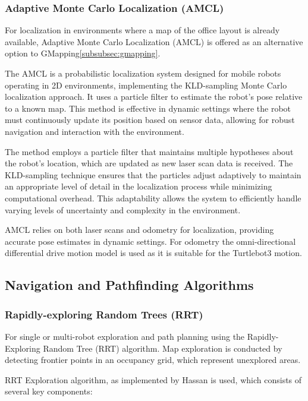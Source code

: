 \documentclass[a4paper,twocolumn]{article}
\begin{document}
\subsubsection{Adaptive Monte Carlo Localization (AMCL)}
For localization in environments where a map of the office layout is already available, Adaptive Monte Carlo Localization (AMCL) is offered as an alternative option to GMapping\ref{subsubsec:gmapping}. 

The AMCL is a probabilistic localization system designed for mobile robots operating in 2D environments, implementing the KLD-sampling Monte Carlo localization approach\cite{thrun2005probabilistic}. It uses a particle filter to estimate the robot's pose relative to a known map. This method is effective in dynamic settings where the robot must continuously update its position based on sensor data, allowing for robust navigation and interaction with the environment.

The method employs a particle filter that maintains multiple hypotheses about the robot's location, which are updated as new laser scan data is received. The KLD-sampling technique ensures that the particles adjust adaptively to maintain an appropriate level of detail in the localization process while minimizing computational overhead. This adaptability allows the system to efficiently handle varying levels of uncertainty and complexity in the environment.

AMCL relies on both laser scans and odometry for localization, providing accurate pose estimates in dynamic settings. For odometry the omni-directional differential drive motion model is used as it is suitable for the Turtlebot3 motion.


\subsection{Navigation and Pathfinding Algorithms}

\subsubsection{Rapidly-exploring Random Trees (RRT)}
\label{subsubsec:rrt}
For single or multi-robot exploration and path planning using the Rapidly-Exploring Random Tree (RRT) algorithm. Map exploration is conducted by detecting frontier points in an occupancy grid, which represent unexplored areas.

RRT Exploration algorithm, as implemented by Hassan\cite{rrt_exploration} is used, which consists of several key components:
\end{document}
